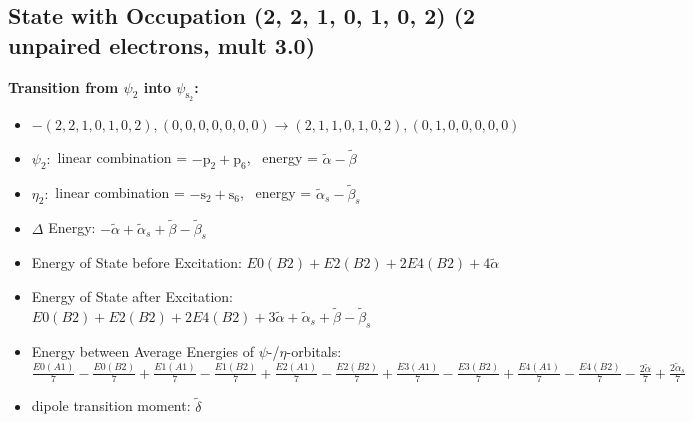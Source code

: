 \documentclass[12pt,a4paper]{article}
\begin{document}
\subsection*{State with Occupation (2, 2, 1, 0, 1, 0, 2) (2 unpaired electrons, mult 3.0)}
        \noindent\textbf{Transition from $\psi_{2}$ into $\psi_{\text{s}_{2}}$:}
        \begin{itemize}
            \item $- (2, 2, 1, 0, 1, 0, 2), (0, 0, 0, 0, 0, 0, 0) \rightarrow (2, 1, 1, 0, 1, 0, 2), (0, 1, 0, 0, 0, 0, 0)$
        
            \item $\psi_{2}:$ linear combination = $- \text{p}_{2} + \text{p}_{6}$, \
            energy = $\tilde{\alpha} - \tilde{\beta}$
            
            \item $\eta_{2}:$ linear combination = $- \text{s}_{2} + \text{s}_{6}$, \
            energy = $\tilde{\alpha}_{s} - \tilde{\beta}_{s}$
            
                \item $\Delta$ Energy: $- \tilde{\alpha} + \tilde{\alpha}_{s} + \tilde{\beta} - \tilde{\beta}_{s}$
                \item Energy of State before Excitation: $E0(B2) + E2(B2) + 2 E4(B2) + 4 \tilde{\alpha}$
                \item Energy of State after Excitation: $E0(B2) + E2(B2) + 2 E4(B2) + 3 \tilde{\alpha} + \tilde{\alpha}_{s} + \tilde{\beta} - \tilde{\beta}_{s}$
                \item Energy between Average Energies of $\psi$-/$\eta$-orbitals: $\frac{E0(A1)}{7} - \frac{E0(B2)}{7} + \frac{E1(A1)}{7} - \frac{E1(B2)}{7} + \frac{E2(A1)}{7} - \frac{E2(B2)}{7} + \frac{E3(A1)}{7} - \frac{E3(B2)}{7} + \frac{E4(A1)}{7} - \frac{E4(B2)}{7} - \frac{2 \tilde{\alpha}}{7} + \frac{2 \tilde{\alpha}_{s}}{7}$
            
            \item dipole transition moment: $\tilde{\delta}$
        
        \end{itemize}
        
\end{document}
